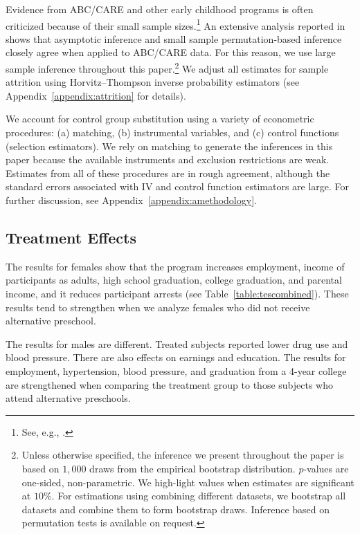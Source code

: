 Evidence from ABC/CARE and other early childhood programs is often criticized because of their small sample sizes.\footnote{See, e.g., \cite{Murray_2013_GivingKids_JJHBOOK}.} An extensive analysis reported in \citet{Campbell_Conti_etal_2014_EarlyChildhoodInvestments} shows that asymptotic inference and small sample permutation-based inference closely agree when applied to ABC/CARE data. For this reason, we use large sample inference throughout this paper.\footnote{Unless otherwise specified, the inference we present throughout the paper is based on $1,000$ draws from the empirical bootstrap distribution. $p$-values are one-sided, non-parametric. We high-light values when estimates are significant at $10\%$. For estimations using combining different datasets, we bootstrap all datasets and combine them to form bootstrap draws. Inference based on permutation tests is available on request.} We adjust all estimates for sample attrition using Horvitz--Thompson \citeyearpar{Horvitz_Thompson_1952_JASA} inverse probability estimators (see Appendix~\ref{appendix:attrition} for details).

We account for control group substitution using a variety of econometric procedures: (a) matching, (b) instrumental variables, and (c) control functions (selection estimators). We rely on matching to generate the inferences in this paper because the available instruments and exclusion restrictions are weak. Estimates from all of these procedures are in rough agreement, although the standard errors associated with IV and control function estimators are large. For further discussion, see Appendix~\ref{appendix:amethodology}.

\subsection{Treatment Effects}

The results for females show that the program increases employment, income of participants as adults, high school graduation, college graduation, and parental income, and it reduces participant arrests (see Table~\ref{table:tescombined}). These results tend to strengthen when we analyze females who did not receive alternative preschool.

The results for males are different. Treated subjects reported lower drug use and blood pressure. There are also effects on earnings and education. The results for employment, hypertension, blood pressure, and graduation from a 4-year college are strengthened when comparing the treatment group to those subjects who attend alternative preschools.

